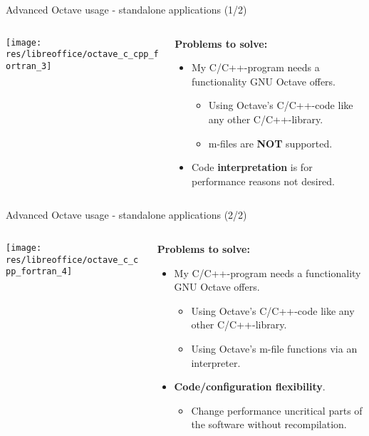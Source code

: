 \begin{frame}{Advanced Octave usage - standalone applications (1/2)}
\begin{columns}
\begin{column}{0.5\textwidth}
\texttt{[image: res/libreoffice/octave\_c\_cpp\_fortran\_3]}
\end{column}
\begin{column}{0.4\textwidth}
\textbf{Problems to solve:}\\[0.8em]

\begin{itemize}
\itemsep1.5em
\item
My C/C++-program needs a functionality GNU Octave offers.
\begin{itemize}
\item
Using Octave's C/C++-code like any other C/C++-library.

\item
m-files are \textbf{NOT} supported.
\end{itemize}

\item
Code \textbf{interpretation} is for performance reasons not desired.
\end{itemize}
\end{column}
\end{columns}
\end{frame}



\begin{frame}{Advanced Octave usage - standalone applications (2/2)}
\begin{columns}
\begin{column}{0.5\textwidth}
\texttt{[image: res/libreoffice/octave\_c\_cpp\_fortran\_4]}
\end{column}
\begin{column}{0.4\textwidth}
\textbf{Problems to solve:}\\[0.8em]

\begin{itemize}
\itemsep1.5em
\item
My C/C++-program needs a functionality GNU Octave offers.
\begin{itemize}
\item
Using Octave's C/C++-code like any other C/C++-library.

\item
Using Octave's m-file functions via an interpreter.
\end{itemize}

\item
\textbf{Code/configuration flexibility}.
\begin{itemize}
\item
Change performance uncritical parts of the software without recompilation.
\end{itemize}
\end{itemize}
\end{column}
\end{columns}
\end{frame}



